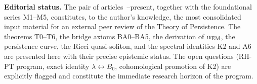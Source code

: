 \textbf{Editorial status.} The pair of articles~\cite{PT_Article1_Foundations}--present, together with the foundational series M1--M5, constitutes, to the author's knowledge, the most consolidated input material for an external peer review of the Theory of Persistence. The theorems T0--T6, the bridge axioms BA0--BA5, the derivation of $\alpha_{\rm EM}$, the persistence curve, the Ricci quasi-soliton, and the spectral identities K2 and A6 are presented here with their precise epistemic status. The open questions (RH-PT program, exact identity $\lambda \leftrightarrow B_0$, cohomological promotion of K2) are explicitly flagged and constitute the immediate research horizon of the program.
